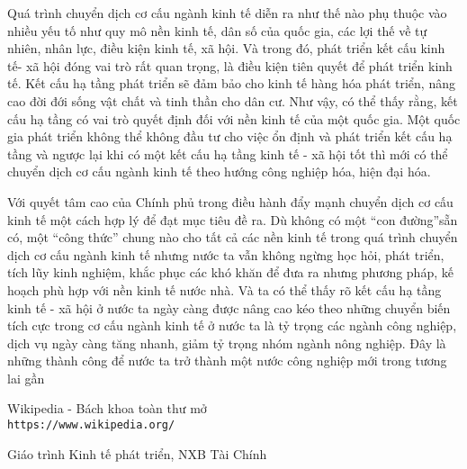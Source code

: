 Quá trình chuyển dịch cơ cấu ngành kinh tế diễn ra như thế nào phụ thuộc vào nhiều yếu tố như quy mô nền kinh tế, dân số của quốc gia, các lợi thế về tự nhiên, nhân lực, điều kiện kinh tế, xã hội. Và trong đó, phát triển kết cấu kinh tế- xã hội đóng vai trò rất quan trọng, là điều kiện tiên quyết để phát triển kinh tế. Kết cấu hạ tầng phát triển sẽ đảm bảo cho kinh tế hàng hóa phát triển, nâng cao đời đới sống vật chất và tinh thần cho dân cư. Như vậy, có thể thấy rằng, kết cấu hạ tầng có vai trò quyết định đối với nền kinh tế của một quốc gia. Một quốc gia phát triển không thể không đầu tư cho việc ổn định và phát triển kết cấu hạ tầng và ngược lại khi có một kết cấu hạ tầng kinh tế - xã hội tốt thì mới có thể chuyển dịch cơ cấu ngành kinh tế theo hướng công nghiệp hóa, hiện đại hóa.

Với quyết tâm cao của Chính phủ trong điều hành đẩy mạnh chuyển dịch cơ cấu kinh tế  một cách hợp lý để đạt mục tiêu đề ra. Dù không có một “con đường”sẵn có, một “công thức” chung nào cho tất cả các nền kinh tế trong quá trình chuyển dịch cơ cấu ngành kinh tế nhưng nước ta vẫn không ngừng học hỏi, phát triển, tích lũy kinh nghiệm, khắc phục các khó khăn để đưa ra nhưng phương pháp, kế hoạch phù hợp với nền kinh tế nước nhà. Và ta có thể thấy rõ kết cấu hạ tầng kinh tế - xã hội ở nước ta ngày càng được nâng cao kéo theo những chuyển biến tích cực trong cơ cấu ngành kinh tế ở nước ta là tỷ trọng các ngành công nghiệp, dịch vụ ngày càng tăng nhanh, giảm tỷ trọng nhóm ngành nông nghiệp. Đây là những thành công để nước ta trở thành một nước công nghiệp mới trong tương lai gần

\begin{thebibliography}{9}
Wikipedia - Bách khoa toàn thư mở \\ \texttt{https://www.wikipedia.org/} 

Giáo trình Kinh tế phát triển, NXB Tài Chính

\end{thebibliography}